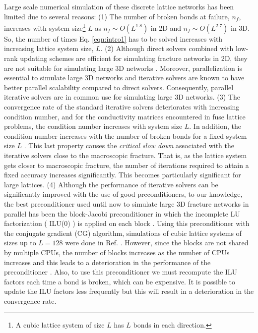 \documentclass[11pt]{iopart}
\begin{document}
Large scale numerical simulation of these discrete lattice networks
has been limited due to several reasons: (1) The number of broken bonds at failure, $n_f$, increases with system size\footnote{A cubic 
lattice system of size $L$ has $L$ bonds in each direction.} $L$ as
$n_f \sim O(L^{1.8})$ in 2D and $n_f \sim O(L^{2.7})$ in 3D. So, the number of times
Eq. \ref{eqn:intro1} has to be solved increases with increasing lattice system size, $L$.
(2) Although direct solvers combined with low-rank updating schemes \cite{nukalajpamg1} are efficient 
for simulating fracture networks in 2D, they are not suitable for simulating large 3D networks \cite{nukala07}. Moreover, 
parallelization is essential to simulate large 3D networks and iterative solvers are known to have better parallel scalability
compared to direct solvers. Consequently, parallel iterative solvers are in common use 
for simulating large 3D networks. (3) The convergence 
rate of the standard iterative solvers deteriorates with increasing condition number, 
and for the conductivity matrices encountered in fuse lattice problems, the condition number increases with system size 
$L$. In addition, the condition number increases with the number of broken bonds for a fixed system size $L$ 
\cite{nukala07, nukalajpamg2}. This last property causes the {\it{critical slow down}} associated with the iterative solvers close
to the macroscopic fracture. That is, as the lattice system gets closer
to macroscopic fracture, the number of iterations required to attain a
fixed accuracy increases significantly. This becomes particularly significant for large lattices. (4) Although the
 performance of iterative solvers can be significantly improved with the use of good preconditioners, to our 
 knowledge, the best preconditioner used until now to simulate large 3D 
fracture networks in parallel has been the block-Jacobi
preconditioner in which the incomplete LU factorization ( ILU(0) ) \cite{saad03} is applied on each block \cite{nukala07}. Using this preconditioner with
the conjugate gradient (CG) algorithm, simulations of cubic lattice systems of sizes up to $L = 128$ were done in Ref. \cite{nukala07}. 
However, since the blocks are not shared by multiple CPUs, the number of 
 blocks increases as the number of CPUs increases and this leads to a deterioration in the performance of the preconditioner \cite{saad03}. 
 Also, to use this preconditioner we must recompute the ILU factors each time a bond is broken, which
can be expensive. It is possible to update the ILU factors less frequently 
but this will result in a deterioration in the convergence rate. 
 
\end{document}
